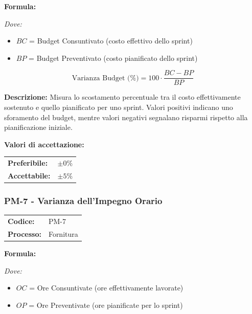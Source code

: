 \documentclass[a4paper,11pt,oneside]{scrartcl}
\begin{document}
\vspace{0.3cm}
\noindent\textbf{Formula:}

\noindent\textit{Dove:}
\begin{itemize}[leftmargin=1.5cm, topsep=0pt, itemsep=0pt]
    \item $BC$ = Budget Consuntivato (costo effettivo dello sprint)
    \item $BP$ = Budget Preventivato (costo pianificato dello sprint)
\end{itemize}

\[
\text{Varianza Budget (\%)} = 100 \cdot \frac{BC - BP}{BP}
\]

\noindent\textbf{Descrizione:} Misura lo scostamento percentuale tra il costo effettivamente sostenuto e quello pianificato per uno sprint. Valori positivi indicano uno sforamento del budget, mentre valori negativi segnalano risparmi rispetto alla pianificazione iniziale.

\vspace{0.2cm}
\noindent\textbf{Valori di accettazione:}
\vspace{0.1cm}

\noindent
\begin{tabular}{@{}ll@{}}
\textbf{Preferibile:} & $\pm 0\%$ \\
\textbf{Accettabile:} & $\pm 5\%$ \\
\end{tabular}

\subsubsection{PM-7 - Varianza dell'Impegno Orario}

\noindent
\begin{tabular}{@{}p{}p{}@{}}
\textbf{Codice:} & PM-7 \\
\textbf{Processo:} & Fornitura \\
\end{tabular}

\vspace{0.3cm}
\noindent\textbf{Formula:}

\noindent\textit{Dove:}
\begin{itemize}[leftmargin=1.5cm, topsep=0pt, itemsep=0pt]
    \item $OC$ = Ore Consuntivate (ore effettivamente lavorate)
    \item $OP$ = Ore Preventivate (ore pianificate per lo sprint)
\end{itemize}
\end{document}
